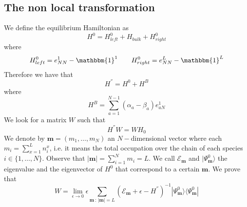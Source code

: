 \documentclass[10pt]{article}
\numberwithin{equation}{section}
\numberwithin{equation}{subsection}
\begin{document}
\subsection{The non local transformation}\label{SectionNonLocalTrasformation}
We define the equilibrium Hamiltonian as
\begin{equation}
	H^{0}=H_{left}^{0}+H_{bulk}+H^{0}_{right}
\end{equation}
where
\begin{equation}
	H_{left}^{0}=e_{NN}^{1}-\mathbbm{1}^{1}\qquad H_{right}^{0}=e_{NN}^{L}-\mathbbm{1}^{L}
\end{equation}
Therefore we have that
\begin{equation}
	H^{''}=H^{0}+H^{B}
\end{equation}
where
\begin{equation}
	H^{B}=\sum_{a=1}^{N-1}(\alpha_{a}-\beta_{a})e_{aN}^{1}
\end{equation}
We look for a matrix $W$ such that 
\begin{equation}\label{GoalWH}
	H^{''}W=WH_{0}
\end{equation}
 We denote by $\bm{m}=(m_{1},\ldots,m_{N})$ an $N-$dimensional vector where each $m_{i}=\sum_{x=1}^{L}n_{i}^{x}$, i.e. it means the total occupation over the chain of each species $i\in\{1,\ldots,N\}$. Observe that $|\bm{m}|=\sum_{i=1}^{N}m_{i}=L$. We call $\mathcal{E}_{\bm{m}}$ and $|\Psi_{\bm{m}}^{0}\rangle$ the eigenvalue and the eigenvector of $H^{0}$ that correspond to a certain $\bm{m}$. We prove that 
\begin{equation}\label{W-extended}
	W= \lim_{\epsilon\to 0}\epsilon\sum_{\bm{m}\,:\,|\bm{m}|=L}  \left(\mathcal{E}_{\bm{m}}+\epsilon-H^{''}\right)^{-1}|\Psi_{\bm{m}}^{0}\rangle \langle \Psi_{\bm{m}}^{0}|
\end{equation}
\end{document}
